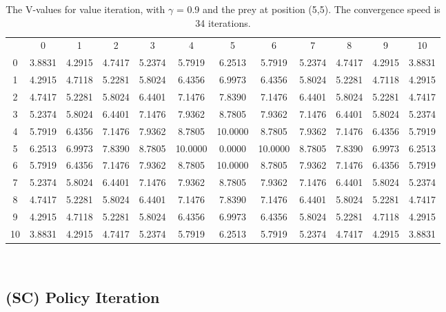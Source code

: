 \documentclass{article}
\begin{document}
\begin{landscape}
\begin{table}[tbp]
\centering
\begin{tabular} {c c c c c c c c c c c c}
 & 0 & 1 & 2 & 3 & 4 & 5 & 6 & 7 & 8 & 9 & 10 \\
0 &  3.8831 &  4.2915 &  4.7417 &  5.2374 &  5.7919 &  6.2513 &  5.7919 &  5.2374 &  4.7417 &  4.2915 &  3.8831\\
1 &  4.2915 &  4.7118 &  5.2281 &  5.8024 &  6.4356 &  6.9973 &  6.4356 &  5.8024 &  5.2281 &  4.7118 &  4.2915\\
2 &  4.7417 &  5.2281 &  5.8024 &  6.4401 &  7.1476 &  7.8390 &  7.1476 &  6.4401 &  5.8024 &  5.2281 &  4.7417\\
3 &  5.2374 &  5.8024 &  6.4401 &  7.1476 &  7.9362 &  8.7805 &  7.9362 &  7.1476 &  6.4401 &  5.8024 &  5.2374\\
4 &  5.7919 &  6.4356 &  7.1476 &  7.9362 &  8.7805 & 10.0000 &  8.7805 &  7.9362 &  7.1476 &  6.4356 &  5.7919\\
5 &  6.2513 &  6.9973 &  7.8390 &  8.7805 & 10.0000 &  0.0000 & 10.0000 &  8.7805 &  7.8390 &  6.9973 &  6.2513\\
6 &  5.7919 &  6.4356 &  7.1476 &  7.9362 &  8.7805 & 10.0000 &  8.7805 &  7.9362 &  7.1476 &  6.4356 &  5.7919\\
7 &  5.2374 &  5.8024 &  6.4401 &  7.1476 &  7.9362 &  8.7805 &  7.9362 &  7.1476 &  6.4401 &  5.8024 &  5.2374\\
8 &  4.7417 &  5.2281 &  5.8024 &  6.4401 &  7.1476 &  7.8390 &  7.1476 &  6.4401 &  5.8024 &  5.2281 &  4.7417\\
9 &  4.2915 &  4.7118 &  5.2281 &  5.8024 &  6.4356 &  6.9973 &  6.4356 &  5.8024 &  5.2281 &  4.7118 &  4.2915\\
10 &  3.8831 &  4.2915 &  4.7417 &  5.2374 &  5.7919 &  6.2513 &  5.7919 &  5.2374 &  4.7417 &  4.2915 &  3.8831\\\end{tabular}\\
\caption{The V-values for value iteration, with $\gamma$ = 0.9 and the prey at position (5,5). The convergence speed is 34 iterations.}
\label{valueiteration4}
\end{table}


\end{landscape}
\newpage


\subsection{(SC) Policy Iteration}
\end{document}
